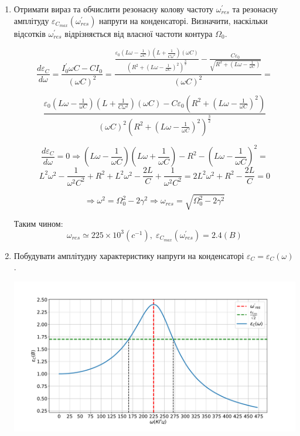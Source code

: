 \documentclass[a4paper, 12pt]{article}
\begin{document}
\begin{enumerate}
    \item Отримати вираз та обчислити резонасну колову частоту $\omega_{res}^{'}$ та
    резонасну амплітуду $\varepsilon_{C_{max}}(\omega_{res}^{'})$ напруги на конденсаторі.
    Визначити, наскільки відсотків $\omega_{res}^{'}$ відрізняється від власної частоти контура $\Omega_0$.
    
    $$ \frac{d \varepsilon_C}{d\omega} = \frac{I_0^{'} \omega C - C I_0}{(\omega C)^2} = 
    \frac{\frac{\varepsilon_0 \left( L \omega - \frac{1}{\omega C} \right) \left( L + \frac{1}{C \omega^2} \right) \left( \omega C  \right)}
    { \left(R^2 + \left( L \omega - \frac{1}{\omega C} \right)^2 \right)^{\frac{3}{2}} } - \frac{C \varepsilon_0}{\sqrt{R^2 + \left( L \omega - \frac{1}{\omega C} \right)}} } {\left( \omega C \right)^2} = $$
    
    $$ \frac{\varepsilon_0 \left( L \omega - \frac{1}{\omega C} \right) \left( L + \frac{1}{C \omega^2} \right) \left( \omega C  \right) - C \varepsilon_0 \left(R^2 + \left( L \omega - \frac{1}{\omega C} \right)^2 \right) }
    {\left( \omega C \right)^2 \left(R^2 + \left( L \omega - \frac{1}{\omega C} \right)^2 \right)^{\frac{3}{2}}} $$
    
    $$ \frac{d \varepsilon_C}{d\omega} = 0 \Rightarrow 
    \left( L \omega - \frac{1}{\omega C} \right) \left( L \omega + \frac{1}{\omega C} \right) -
    R^2 - \left( L \omega - \frac{1}{\omega C} \right)^2 = $$ 
    $$ L^2 \omega^2 - \frac{1}{\omega^2 C^2} + R^2 + L^2 \omega^2 - \frac{2L}{C} + \frac{1}{\omega^2 C^2} =
    2 L^2 \omega^2 + R^2 - \frac{2L}{C} = 0 $$ 
    
    $$ \Rightarrow \omega^2 = \Omega_0^2 - 2\gamma^2 \Rightarrow \omega_{res} = \sqrt{\Omega_0^2 - 2\gamma^2} $$
    
    Таким чином:
    $$ \omega_{res} \simeq 225\times10^3(c^{-1}),\; \varepsilon_{C_{max}}(\omega_{res}^{'}) = 2.4(B)$$

    \item Побудувати амплітудну характеристику напруги на конденсаторі $\varepsilon_C = \varepsilon_C(\omega)$.
    
    \includegraphics[width=1.0\textwidth]{graphics/EC(w).pdf}


\end{enumerate}
\end{document}
